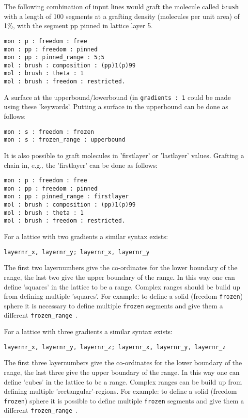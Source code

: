 \documentclass{article}
\begin{document}
The following combination of input lines would graft the molecule called {\tt brush} with a length of 100 segments at a grafting density (molecules per unit area) of 1\%, with the segment pp pinned in lattice layer 5.
\begin{verbatim}
mon : p : freedom : free
mon : pp : freedom : pinned
mon : pp : pinned_range : 5;5
mol : brush : composition : (pp)1(p)99
mol : brush : theta : 1
mol : brush : freedom : restricted.
\end{verbatim}
A surface at the upperbound/lowerbound (in {\tt gradients : 1}  could be made using these 'keywords'. Putting a surface in the upperbound can be done as follows: 
\begin{verbatim}
mon : s : freedom : frozen
mon : s : frozen_range : upperbound
\end{verbatim}
It is also possible to graft molecules in 'firstlayer' or 'lastlayer' values. Grafting a chain in, e.g., the 'firstlayer' can be done as follows:
\begin{verbatim}
mon : p : freedom : free
mon : pp : freedom : pinned
mon : pp : pinned_range : firstlayer
mol : brush : composition : (pp)1(p)99
mol : brush : theta : 1
mol : brush : freedom : restricted.
\end{verbatim}

For a lattice with two gradients a similar syntax exists:
\begin{verbatim}
layernr_x, layernr_y; layernr_x, layernr_y
\end{verbatim}
The first two layernumbers give the co-ordinates for the lower boundary of the range, the last two give the upper boundary of the range.  In this way one can define 'squares' in the lattice to be a range.  Complex ranges should be build up from defining multiple 'squares'.  For example: to define a solid (freedom {\tt frozen}) sphere it is necessary to define multiple {\tt frozen} segments and give them a different {\tt frozen\_range }.

For a lattice with three gradients a similar syntax exists:
\begin{verbatim}
layernr_x, layernr_y, layernr_z; layernr_x, layernr_y, layernr_z
\end{verbatim}
The first three layernumbers give the co-ordinates for the lower boundary of the range, the last three give the upper boundary of the range.  In this way one can define 'cubes' in the lattice to be a range.  Complex ranges can be build up from defining multiple 'rectangular'-regions.  For example: to define a solid (freedom {\tt frozen}) sphere it is possible to define multiple {\tt frozen} segments and give them a different {\tt frozen\_range }.
\end{document}
